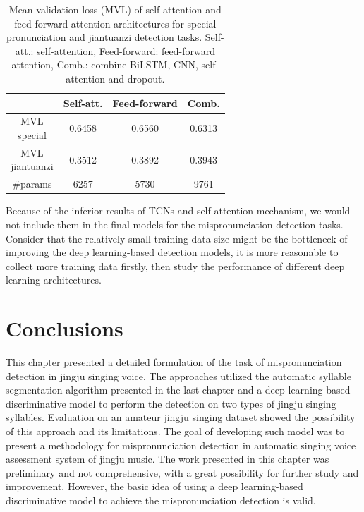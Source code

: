 \begin{table}[ht!]
\centering
\caption{Mean validation loss (MVL) of self-attention and feed-forward attention architectures for special pronunciation and jiantuanzi detection tasks. Self-att.: self-attention, Feed-forward: feed-forward attention, Comb.: combine BiLSTM, CNN, self-attention and dropout.}
\label{tab:ch6:results_self_att_val}
\begin{tabular}{cccc}
\toprule
& Self-att. & Feed-forward & Comb. \\
\midrule
\makecell{MVL\\special} & 0.6458 & 0.6560 & 0.6313 \\
\makecell{MVL\\jiantuanzi} & 0.3512 & 0.3892 & 0.3943 \\
\#params & 6257 & 5730 & 9761 \\
\bottomrule
\end{tabular}
\end{table}

Because of the inferior results of \gls{TCNs} and self-attention mechanism, we would not include them in the final models for the mispronunciation detection tasks. Consider that the relatively small training data size might be the bottleneck of improving the deep learning-based detection models, it is more reasonable to collect more training data firstly, then study the performance of different deep learning architectures.

\section{Conclusions} 

This chapter presented a detailed formulation of the task of mispronunciation detection in jingju singing voice. The approaches utilized the automatic syllable segmentation algorithm presented in the last chapter and a deep learning-based discriminative model to perform the detection on two types of jingju singing syllables. Evaluation on an amateur jingju singing dataset showed the possibility of this approach and its limitations. The goal of developing such model was to present a methodology for mispronunciation detection in automatic singing voice assessment system of jingju music. The work presented in this chapter was preliminary and not comprehensive, with a great possibility for further study and improvement. However, the basic idea of using a deep learning-based discriminative model to achieve the mispronunciation detection is valid.

